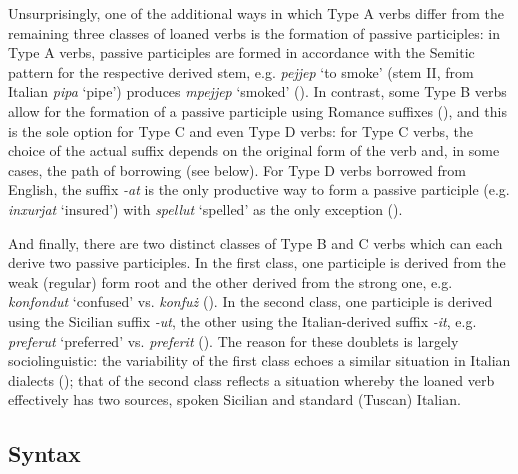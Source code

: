 \documentclass[output=paper]{langsci/langscibook}
\begin{document}
\label{participles} %
Unsurprisingly, one of the additional ways in which Type A verbs differ from the remaining three classes of loaned verbs is the formation of passive participles: in Type A verbs, passive participles are formed in accordance with the Semitic pattern for the respective derived stem, e.g. \textit{pejjep} `to smoke' (stem II, from Italian \textit{pipa} `pipe') produces \textit{mpejjep} `smoked' (\citealt[70]{mifsudloanverbs}). In contrast, some Type B verbs allow for the formation of a passive participle using Romance suffixes (\citealt[127--133]{mifsudloanverbs}), and this is the sole option for Type C and even Type D verbs: for Type C verbs, the choice of the actual suffix depends on the original form of the verb and, in some cases, the path of borrowing (see below). For Type D verbs borrowed from English, the suffix \textit{-at} is the only productive way to form a passive participle (e.g. \textit{inxurjat} `insured') with \textit{spellut} `spelled' as the only exception (\citealt[248]{mifsudloanverbs}).

And finally, there are two distinct classes of Type B and C verbs which can each derive two passive participles. In the first class, one participle is derived from the weak (regular) form root and the other derived from the strong one, e.g. \textit{konfondut} `confused' vs. \textit{konfuż} (\citealt[134]{mifsudloanverbs}). In the second class, one participle is derived using the Sicilian suffix \textit{-ut}, the other using the Italian-derived suffix \textit{-it}, e.g. \textit{preferut} `preferred' vs. \textit{preferit} (\citealt[230]{mifsudloanverbs}). The reason for these doublets is largely sociolinguistic: the variability of the first class echoes a similar situation in Italian dialects (\citealt[134]{mifsudloanverbs}); that of the second class reflects a situation whereby the loaned verb effectively has two sources, spoken Sicilian and standard (Tuscan) Italian.
\subsection{Syntax}
\end{document}

